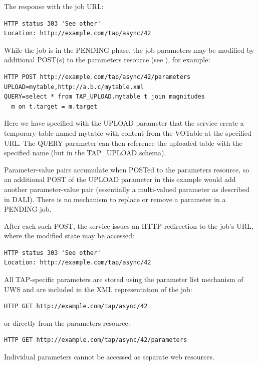 \documentclass[11pt,letter]{ivoa}
\newcommand{\tapupload}{TAP\_UPLOAD}
\newcommand{\tapupload}{%
  {\relsize{-0.5}TAP\discretionary{-}{}{\kern-2pt\_}UPLOAD}}
\begin{document}
The response with the job URL:

\begin{verbatim}
HTTP status 303 'See other'
Location: http://example.com/tap/async/42
\end{verbatim}

While the job is in the PENDING phase, the job parameters may be modified 
by additional POST(s) to the parameters resource (see 
\citet{2017ivoa.spec.0517D}), for example:

\begin{verbatim}
HTTP POST http://example.com/tap/async/42/parameters
UPLOAD=mytable,http://a.b.c/mytable.xml
QUERY=select * from TAP_UPLOAD.mytable t join magnitudes 
  m on t.target = m.target
\end{verbatim}

Here we have specified with the UPLOAD parameter that the service create a 
temporary table named mytable with content from the VOTable at the specified 
URL. The QUERY parameter can then reference the uploaded table with the 
specified name (but in the \tapupload{} schema).

Parameter-value pairs accumulate when POSTed to the parameters resource, so an 
additional POST of the UPLOAD parameter in this example would add another 
parameter-value pair (essentially a multi-valued parameter as described in 
DALI). There is no mechanism to replace or remove a parameter in a 
PENDING job.

After each such POST, the service issues an HTTP redirection to the job's URL, 
where the modified state may be accessed:

\begin{verbatim}
HTTP status 303 'See other'
Location: http://example.com/tap/async/42
\end{verbatim}

All TAP-specific parameters are stored using the parameter list mechanism of 
UWS and are included in the XML representation of the job:
\begin{verbatim}
HTTP GET http://example.com/tap/async/42
\end{verbatim}
or directly from the parameters resource:
\begin{verbatim}
HTTP GET http://example.com/tap/async/42/parameters
\end{verbatim}
Individual parameters cannot be accessed as separate web resources.
\end{document}
